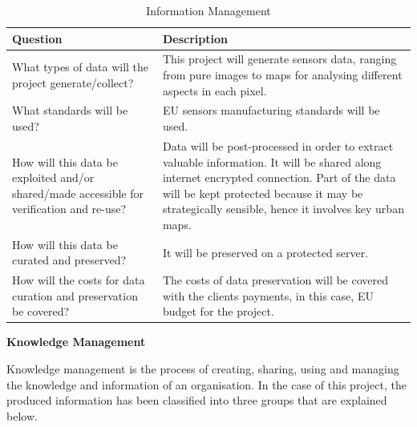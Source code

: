 \begin{table}[H]
	\centering
	\begin{tabular}{p{7cm} p{7cm}}
		
		\toprule[2pt]
		
		\textbf{Question} &  \textbf{Description}\\
		
		\midrule [1.5pt]
		
		What types of data will the project generate/collect?  & This project will generate sensors data, ranging from pure images to maps for analysing different aspects in each pixel.\vspace{0.2cm}\\
		
		\midrule
		
		What standards will be used?  & EU sensors manufacturing standards will be used.\vspace{0.2cm}\\
		
		\midrule
		
		How will this data be exploited and/or shared/made accessible for verification and re-use? & Data will be post-processed in order to extract valuable information. It will be shared along internet encrypted connection. Part of the data will be kept protected because it may be strategically sensible, hence it involves key urban maps.\vspace{0.2cm}\\
		
		\midrule
		
		How will this data be curated and preserved? & It will be preserved on a protected server.\vspace{0.2cm}\\
		
		\midrule
		
		How will the costs for data curation and preservation be covered? & The costs of data preservation will be covered with the clients payments, in this case, EU budget for the project.\vspace{0.2cm}\\	
		
		\bottomrule[2pt]
		
	\end{tabular}
	\caption{Information Management}
\end{table}

\textbf{Knowledge Management}

Knowledge management is the process of creating, sharing, using and managing the knowledge and information of an organisation. In the case of this project, the produced information has been classified into three groups that are explained below.

